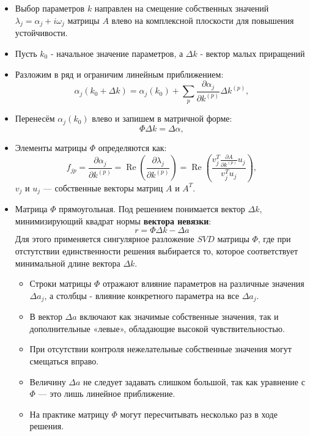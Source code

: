 	\begin{itemize}
		\item Выбор параметров \(k\) направлен на смещение собственных значений \(\lambda_j = \alpha_j + i\omega_j\) матрицы \(A\) влево на комплексной плоскости для повышения устойчивости.
		\item Пусть \(k_0\) - начальное значение параметров, а \(\Delta k\) - вектор малых приращений
		\item Разложим в ряд и ограничим линейным приближением: 
		\begin{equation}
			\alpha_j(k_0 + \Delta k) = \alpha_j(k_0) + \sum_p \frac{\partial \alpha_j}{\partial k^{(p)}} \Delta k^{(p)},
		\end{equation}
		\item Перенесём \(\alpha_j(k_0)\) влево и запишем в матричной форме:
		\begin{equation}
			\Phi \Delta k = \Delta \alpha,
		\end{equation}
		\item Элементы матрицы \(\Phi\) определяются как:
		\begin{equation}
			f_{jp} = \frac{\partial \alpha_j}{\partial k^{(p)}} = \operatorname{Re} \left( \frac{\partial \lambda_j}{\partial k^{(p)}} \right) = \operatorname{Re} \left( \frac{v_j^T \frac{\partial A}{\partial k^{(p)}} u_j}{v_j^T u_j} \right),
		\end{equation}
		\(v_j\) и \(u_j\) — собственные векторы матриц \(A\) и \(A^T\). 
		\item Матрица \(\Phi\) прямоугольная. Под решением понимается вектор \(\Delta k\), минимизирующий квадрат нормы \textbf{вектора невязки}:
		\begin{equation}
			r = \Phi \Delta k - \Delta a
		\end{equation}
		Для этого применяется сингулярное разложение \(SVD\) матрицы \(\Phi\), где при отстутствии единственности решения выбирается то, которое соответствует минимальной длине вектора \(\Delta k\).
		\begin{itemize}
			\item Строки матрицы \(\Phi\) отражают влияние параметров на различные значения \(\Delta a_j\), а столбцы - влияние конкретного параметра на все \(\Delta a_j\).
			\item В вектор \(\Delta a\) включают как значимые собственные значения, так и дополнительные 
			\newline 
			«левые», обладающие высокой чувствительностью.
			\item При отсутствии контроля нежелательные собственные значения могут смещаться вправо.
			\item Величину \(\Delta a\) не следует задавать слишком большой, так как уравнение с \(\Phi\) — это лишь линейное приближение.
			\item На практике матрицу \(\Phi\) могут пересчитывать несколько раз в ходе решения.
		\end{itemize}
	\end{itemize}
	

